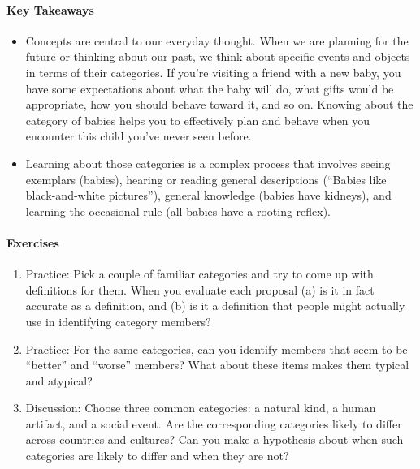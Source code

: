 \documentclass[
]{krantz}
\providecommand{\tightlist}{%
  \setlength{\itemsep}{0pt}\setlength{\parskip}{0pt}}
\begin{document}
\paragraph*{Key Takeaways}\label{key-takeaways-6}

\begin{itemize}
\tightlist
\item
  Concepts are central to our everyday thought. When we are planning for the future or thinking about our past, we think about specific events and objects in terms of their categories. If you're visiting a friend with a new baby, you have some expectations about what the baby will do, what gifts would be appropriate, how you should behave toward it, and so on. Knowing about the category of babies helps you to effectively plan and behave when you encounter this child you've never seen before.
\item
  Learning about those categories is a complex process that involves seeing exemplars (babies), hearing or reading general descriptions (``Babies like black-and-white pictures''), general knowledge (babies have kidneys), and learning the occasional rule (all babies have a rooting reflex).
\end{itemize}

\paragraph*{Exercises}\label{exercises-6}

\begin{enumerate}
\def\labelenumi{\arabic{enumi}.}
\tightlist
\item
  Practice: Pick a couple of familiar categories and try to come up with definitions for them. When you evaluate each proposal (a) is it in fact accurate as a definition, and (b) is it a definition that people might actually use in identifying category members?
\item
  Practice: For the same categories, can you identify members that seem to be ``better'' and ``worse'' members? What about these items makes them typical and atypical?
\item
  Discussion: Choose three common categories: a natural kind, a human artifact, and a social event. Are the corresponding categories likely to differ across countries and cultures? Can you make a hypothesis about when such categories are likely to differ and when they are not?
\end{enumerate}
\end{document}
